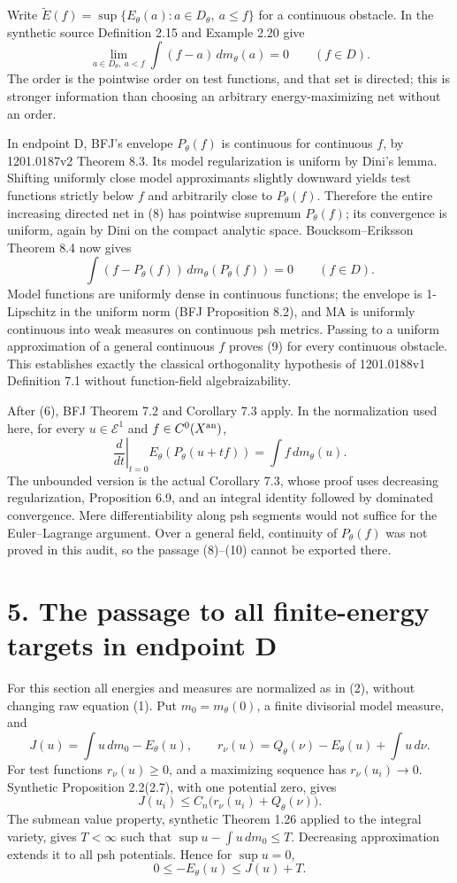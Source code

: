 \documentclass[11pt]{article}
\begin{document}
Write \(\widetilde E(f)=\sup\{E_\theta(a):a\in D_\theta,\ a\leq f\}\) for a continuous obstacle. In the synthetic source Definition 2.15 and Example 2.20 give
\[
 \lim_{a\in D_\theta,\ a<f}\int(f-a)\,dm_\theta(a)=0
 \qquad(f\in D).
 \tag{8}
\]
The order is the pointwise order on test functions, and that set is directed; this is stronger information than choosing an arbitrary energy-maximizing net without an order.

In endpoint D, BFJ's envelope \(P_\theta(f)\) is continuous for continuous \(f\), by 1201.0187v2 Theorem 8.3. Its model regularization is uniform by Dini's lemma. Shifting uniformly close model approximants slightly downward yields test functions strictly below \(f\) and arbitrarily close to \(P_\theta(f)\). Therefore the entire increasing directed net in (8) has pointwise supremum \(P_\theta(f)\); its convergence is uniform, again by Dini on the compact analytic space. Boucksom--Eriksson Theorem 8.4 now gives
\[
 \int(f-P_\theta(f))\,dm_\theta(P_\theta(f))=0
 \qquad(f\in D).
 \tag{9}
\]
Model functions are uniformly dense in continuous functions; the envelope is 1-Lipschitz in the uniform norm (BFJ Proposition 8.2), and MA is uniformly continuous into weak measures on continuous psh metrics. Passing to a uniform approximation of a general continuous \(f\) proves (9) for every continuous obstacle. This establishes exactly the classical orthogonality hypothesis of 1201.0188v1 Definition 7.1 without function-field algebraizability.

After (6), BFJ Theorem 7.2 and Corollary 7.3 apply. In the normalization used here, for every \(u\in\mathcal E^1\) and \(f\in C^0(X^{\rm an})\),
\[
 \left.\frac d{dt}\right|_{t=0}E_\theta(P_\theta(u+tf))
 =\int f\,dm_\theta(u).
 \tag{10}
\]
The unbounded version is the actual Corollary 7.3, whose proof uses decreasing regularization, Proposition 6.9, and an integral identity followed by dominated convergence. Mere differentiability along psh segments would not suffice for the Euler--Lagrange argument. Over a general field, continuity of \(P_\theta(f)\) was not proved in this audit, so the passage (8)--(10) cannot be exported there.

\section*{5. The passage to all finite-energy targets in endpoint D}

For this section all energies and measures are normalized as in (2), without changing raw equation (1). Put \(m_0=m_\theta(0)\), a finite divisorial model measure, and
\[
 J(u)=\int u\,dm_0-E_\theta(u),\qquad
 r_\nu(u)=Q_\theta(\nu)-E_\theta(u)+\int u\,d\nu.
 \tag{11}
\]
For test functions \(r_\nu(u)\geq0\), and a maximizing sequence has \(r_\nu(u_i)\to0\). Synthetic Proposition 2.2(2.7), with one potential zero, gives
\[
 J(u_i)\leq C_n\big(r_\nu(u_i)+Q_\theta(\nu)\big).
 \tag{12}
\]
The submean value property, synthetic Theorem 1.26 applied to the integral variety, gives \(T<\infty\) such that \(\sup u-\int u\,dm_0\leq T\). Decreasing approximation extends it to all psh potentials. Hence for \(\sup u=0\),
\[
 0\leq-E_\theta(u)\leq J(u)+T.
 \tag{13}
\]
\end{document}

